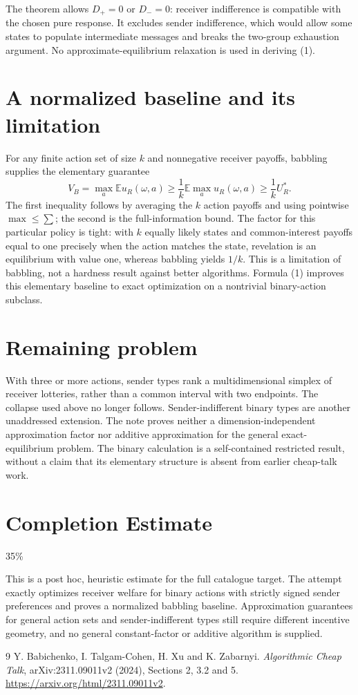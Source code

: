 \documentclass[11pt]{article}
\theoremstyle{definition}
\begin{document}
The theorem allows $D_+=0$ or $D_-=0$: receiver indifference is compatible
with the chosen pure response. It excludes sender indifference, which
would allow some states to populate intermediate messages and breaks the
two-group exhaustion argument. No approximate-equilibrium relaxation is
used in deriving (1).

\section*{A normalized baseline and its limitation}
For any finite action set of size $k$ and nonnegative receiver payoffs,
babbling supplies the elementary guarantee
\[
 V_B=\max_a\mathbb E u_R(\omega,a)
 \ge\frac1k\mathbb E\max_a u_R(\omega,a)
 \ge\frac1k U_R^*.                                      \tag{3}
\]
The first inequality follows by averaging the $k$ action payoffs and
using pointwise $\max\le\sum$; the second is the full-information bound.
The factor for this particular policy is tight: with $k$ equally likely
states and common-interest payoffs equal to one precisely when the action
matches the state, revelation is an equilibrium with value one, whereas
babbling yields $1/k$. This is a limitation of babbling, not a hardness
result against better algorithms. Formula (1) improves this elementary
baseline to exact optimization on a nontrivial binary-action subclass.

\section*{Remaining problem}
With three or more actions, sender types rank a multidimensional simplex
of receiver lotteries, rather than a common interval with two endpoints.
The collapse used above no longer follows. Sender-indifferent binary
types are another unaddressed extension. The note proves neither a
dimension-independent approximation factor nor additive approximation
for the general exact-equilibrium problem. The binary calculation is a
self-contained restricted result, without a claim that its elementary
structure is absent from earlier cheap-talk work.

\section{Completion Estimate}
35\%

This is a post hoc, heuristic estimate for the full catalogue target.
The attempt exactly optimizes receiver welfare for binary actions with strictly signed sender preferences and proves a normalized babbling baseline. Approximation guarantees for general action sets and sender-indifferent types still require different incentive geometry, and no general constant-factor or additive algorithm is supplied.

\begin{thebibliography}{9}
 Y. Babichenko, I. Talgam-Cohen, H. Xu and K. Zabarnyi.
\emph{Algorithmic Cheap Talk}, arXiv:2311.09011v2 (2024),
Sections 2, 3.2 and 5.
\url{https://arxiv.org/html/2311.09011v2}.
\end{thebibliography}
\end{document}
